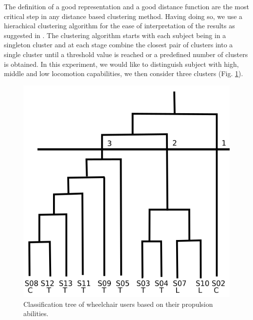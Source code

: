 The definition of a good representation and a good distance function are the most critical step in any distance based clustering method. Having doing so, we use a hierachical clustering algorithm for the ease of interpretation of the results as suggested in \cite{kumar2002clustering}. The clustering algorithm starts with each subject being in a singleton cluster and at each stage combine the closest pair of clusters into a single cluster until a threshold value is reached or a predefined number of clusters is obtained. In this experiment, we would like to distinguish subject with high, middle and low locomotion capabilities, we then consider three clusters (Fig. \ref{classification_tree}). 

\begin{figure}[h]
\center
\includegraphics[scale = 0.6]{images/histogramme_sujets_frm}
\caption{Classification tree of wheelchair users based on their propulsion abilities.}
\label{classification_tree}
\end{figure}


